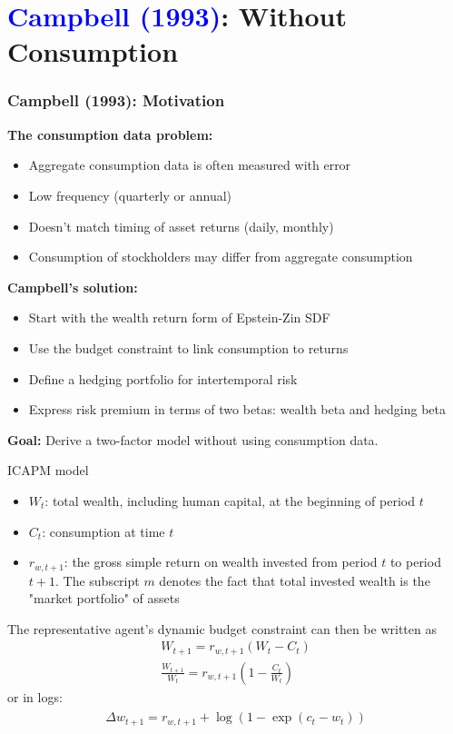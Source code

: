 \documentclass{beamer}
\begin{document}
\section{\textcolor{blue}{Campbell (1993)}: Without Consumption}

\begin{frame}
    \frametitle{Campbell (1993): Motivation}
    
    \textbf{The consumption data problem:}
    \begin{itemize}
        \item Aggregate consumption data is often measured with error
        \item Low frequency (quarterly or annual)
        \item Doesn't match timing of asset returns (daily, monthly)
        \item Consumption of stockholders may differ from aggregate consumption
    \end{itemize}
    
    \textbf{Campbell's solution:}
    \begin{itemize}
        \item Start with the wealth return form of Epstein-Zin SDF
        \item Use the budget constraint to link consumption to returns
        \item Define a hedging portfolio for intertemporal risk
        \item Express risk premium in terms of two betas: wealth beta and hedging beta
    \end{itemize}
    
    \textbf{Goal:} Derive a two-factor model without using consumption data.
\end{frame}



\begin{frame}{ICAPM model}
	\begin{itemize}
		\item $ W_t $: total wealth, including human capital, at the beginning of period $t$
		\item $ C_t $: consumption at time $t$
		\item $ r_{w,t+1} $: the gross simple return on wealth invested from period $ t $ to period $ t+1 $. The subscript $ m $ denotes the fact that total invested wealth is the "market portfolio" of assets
	\end{itemize}
	The representative agent's dynamic budget constraint can then be written as
	\begin{align}
		W_{t+1}=r_{w, t+1}\left(W_{t}-C_{t}\right)\\
		\frac{W_{t+1}}{W_{t}}=r_{w, t+1}\left(1-\frac{C_{t}}{W_{t}}\right)
	\end{align}
	or in logs:
	\begin{align}
		\begin{aligned}
			\Delta w_{t+1}  =r_{w, t+1}+\log \left(1-\exp \left(c_{t}-w_{t}\right)\right)
		\end{aligned}
	\end{align}
\end{frame}
\end{document}
